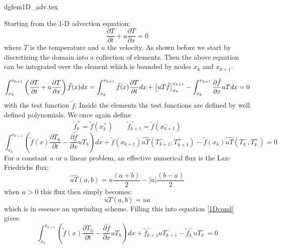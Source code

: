 \begin{flushright} {\tiny {\color{gray} dgfem1D\_adv.tex}} \end{flushright}

Starting from the 1-D advection equation:
\begin{equation}
    \frac{\partial T}{\partial t}+u\frac{\partial T}{\partial x}=0 
\end{equation}
where $T$ is the temperature and $u$ the velocity. 
As shown before we start by discretizing the domain into a collection of elements. Then the above equation can be integrated over the element which is bounded by nodes $x_k$ and $x_{k+1}$. 

\begin{equation}
\int_{x_k}^{x_{k+1}}  \left(\frac{\partial T}{\partial t}+u\frac{\partial T}{\partial x}\right) \tilde{f}(x) dx 
=
\int_{x_k}^{x_{k+1}} \tilde{f}(x)\frac{\partial T}{\partial t} dx
+\left[ uT \tilde{f}  \right]_{x_k}^{x_{k+1}}
-\int_{x_k}^{x_{k+1}} \frac{\partial \tilde{f}}{\partial x} uT dx
=0 \nonumber
\end{equation}
with the test function $\tilde{f}$. 
Inside the elements the test functions are defined by well defined polynomials. 
We once again define
\[
\tilde{f}_k^+=\tilde{f}(x_k^+)
\qquad
\tilde{f}_{k+1}^-=\tilde{f}(x_{k+1}^-)
\]
\begin{equation}
    \int_{x_k}^{x_{k+1}}\left(
    \tilde{f}(x)\frac{\partial T_h}{\partial t}-
    \frac{\partial \tilde{f}}{\partial x} uT_h \right) dx
    +\tilde{f}(x_{k+1})\widehat{uT}(T_{k+1}^-,T_{k+1}^+)
    -\tilde{f}(x_{k})\widehat{uT}(T_{k}^-,T_{k}^+)=0
    \label{1Dcond}
\end{equation}
For a constant $u$ or a linear problem, an effective numerical flux
is the Lax-Friedrichs flux:
\begin{equation}
\widehat{uT}(a,b)=u \frac{(a+b)}{2}-|u|\frac{(b-a)}{2}
\end{equation}
when $u>0$ this flux then simply becomes:
\begin{equation}
uT(a,b)=u a
\end{equation}
which is in essence an upwinding scheme.
Filling this into equation \eqref{1Dcond} gives:
\begin{equation}
\int_{x_k}^{x_{k+1}}\left(
\tilde{f}(x)\frac{\partial T_h}{\partial t}-
\frac{\partial \tilde{f}}{\partial x} uT_h \right) dx
+\tilde{f}_{k+1}^-uT_{k+1}^-     -\tilde{f}_{k}^-uT_{k}^-=0
\end{equation}
